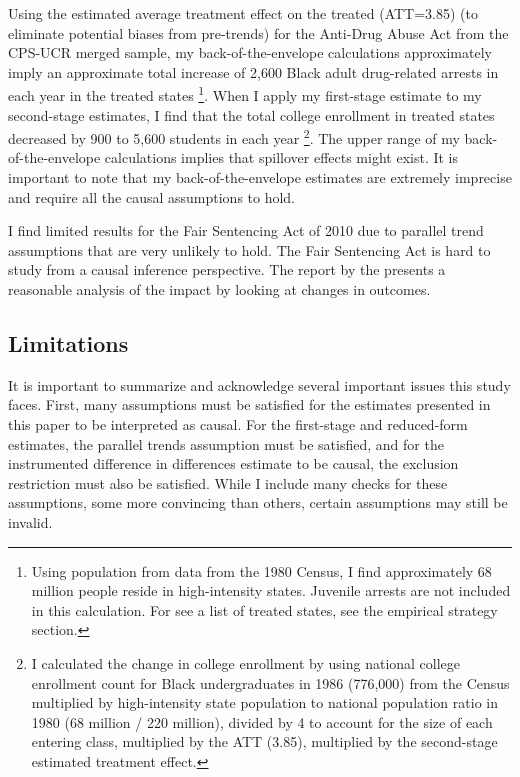 \documentclass{article}
\begin{document}
Using the estimated average treatment effect on the treated (ATT=3.85) (to eliminate potential biases from pre-trends) for the Anti-Drug Abuse Act from the CPS-UCR merged sample, my back-of-the-envelope calculations approximately imply an approximate total increase of 2,600 Black adult drug-related arrests in each year in the treated states \footnote{Using population from data from the 1980 Census, I find approximately 68 million people reside in high-intensity states. Juvenile arrests are not included in this calculation. For see a list of treated states, see the empirical strategy section.}. When I apply my first-stage estimate to my second-stage estimates, I find that the total college enrollment in  treated states decreased by 900 to 5,600 students in each year \footnote{I calculated the change in college enrollment by using national college enrollment count for Black undergraduates in 1986 (776,000) from the Census multiplied by high-intensity state population to national population ratio in 1980 (68 million / 220 million), divided by 4 to account for the size of each entering class, multiplied by the ATT (3.85), multiplied by the second-stage estimated treatment effect.}. The upper range of my back-of-the-envelope calculations implies that spillover effects might exist. It is important to note that my back-of-the-envelope estimates are extremely imprecise and require all the causal assumptions to hold.

I find limited results for the Fair Sentencing Act of 2010 due to parallel trend assumptions that are very unlikely to hold. The Fair Sentencing Act is hard to study from a causal inference perspective. The report by the \cite{ussc} presents a reasonable analysis of the impact by looking at changes in outcomes. 

\subsection{Limitations}

It is important to summarize and acknowledge several important issues this study faces. First, many assumptions must be satisfied for the estimates presented in this paper to be interpreted as causal. For the first-stage and reduced-form estimates, the parallel trends assumption must be satisfied, and for the instrumented difference in differences estimate to be causal, the exclusion restriction must also be satisfied. While I include many checks for these assumptions, some more convincing than others, certain assumptions may still be invalid. 
\end{document}
